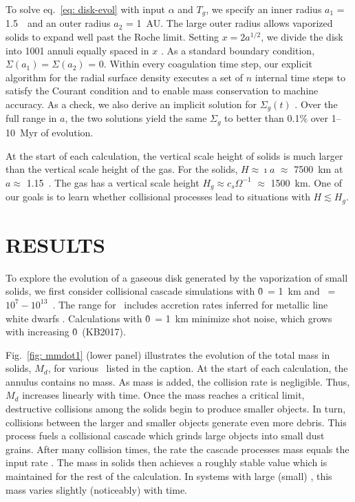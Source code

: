 \documentclass[12pt,preprint]{aastex}
\begin{document}
To solve eq.~\ref{eq: disk-evol} with input $\alpha$ and $T_g$, we specify an inner 
radius $a_1$ = 1.5~\rstar\ and an outer radius $a_2$ = 1~AU.  The large outer radius
allows vaporized solids to expand well past the Roche limit.  Setting $x = 2 a^{1/2}$, 
we divide the disk into 1001 annuli equally spaced in $x$ \citep[see also][]{bath1981,
bath1982}. As a standard boundary condition, $\Sigma(a_1) = \Sigma(a_2)$ = 0. Within 
every coagulation time step, our explicit algorithm for the radial surface density 
executes a set of $n$ internal time steps to satisfy the Courant condition and to 
enable mass conservation to machine accuracy.  As a check, we also derive an implicit 
solution for $\Sigma_g(t)$ \citep{press1992}. Over the full range in $a$, the two 
solutions yield the same $\Sigma_g$ to better than 0.1\% over 1--10~Myr of evolution.

At the start of each calculation, the vertical scale height of solids is much larger
than the vertical scale height of the gas. For the solids, $H \approx \imath a$
$\approx$ 7500~km at $a \approx$ 1.15~\rsun. The gas has a vertical scale height
$H_g \approx c_s \Omega^{-1}$ $ \approx $ 1500~km. One of our goals is to learn whether 
collisional processes lead to situations with $H \lesssim H_g$.

\section{RESULTS}

To explore the evolution of a gaseous disk generated by the vaporization of small solids, 
we first consider collisional cascade simulations with \r0\ = 1~km and \mdotz\ = 
$10^7 - 10^{13}$~\gs. The range for \mdotz\ includes accretion rates inferred for 
metallic line white dwarfs \citep{wyatt2014,farihi2016}.  
Calculations with \r0\ = 1~km minimize shot noise, which grows with increasing 
\r0\ (KB2017). 

Fig.~\ref{fig: mmdot1} (lower panel) illustrates the evolution of the total mass in solids, 
$M_d$, for various \mdotz\ listed in the caption. At the start of each calculation, the
annulus contains no mass. As mass is added, the collision rate is negligible. Thus,
$M_d$ increases linearly with time. Once the mass reaches a critical limit, destructive
collisions among the solids begin to produce smaller objects. In turn, collisions
between the larger and smaller objects generate even more debris. This process fuels
a collisional cascade which grinds large objects into small dust grains. After many 
collision times, the rate the cascade processes mass equals the input rate \mdotz. 
The mass in solids then achieves a roughly stable value which is maintained for the 
rest of the calculation. In systems with large (small) \mdotz, this mass varies 
slightly (noticeably) with time.
\end{document}
